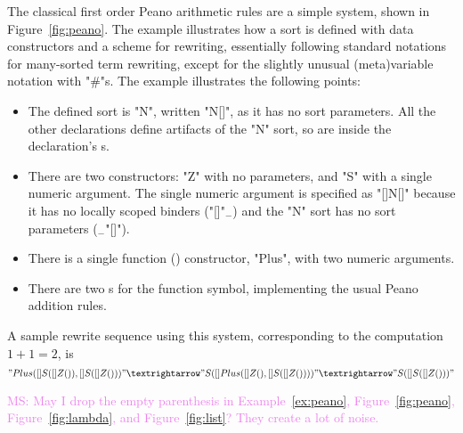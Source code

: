 \documentclass[letterpaper,11pt]{article}
\newcommand{\MS}[1]{\textcolor{violet}{MS: #1}}
\begin{document}
\begin{figure*}[p]
\end{figure*}



\begin{example}[Peano]\label{ex:peano}
  The classical first order Peano arithmetic rules are a simple \hax system, shown in
  Figure~\ref{fig:peano}.  The example illustrates how a sort is defined with data constructors and
  a scheme for rewriting, essentially following standard notations for many-sorted term rewriting,
  except for the slightly unusual (meta)variable notation with "#"s. The example illustrates the
  following points:
  \begin{itemize}

  \item The defined sort is "N", written "N[]", as it has no sort parameters. All the other
    declarations define artifacts of the "N" sort, so are inside the  declaration's
    \kw{\{\}}s.

  \item There are two  constructors: "Z" with no parameters, and "S" with a single numeric
    argument. The single numeric argument is specified as "[]N[]" because it has no locally scoped
    binders ("[]"$_-$) and the "N" sort has no sort parameters ($_-$"[]").

  \item There is a single function () constructor, "Plus", with two numeric arguments.

  \item There are two s for the function symbol, implementing the usual Peano addition rules.

  \end{itemize}
  A sample rewrite sequence using this system, corresponding to the computation $1+1=2$, is
  \begin{displaymath}
    "Plus([]S([]Z()), []S([]Z()))" →
    "S([]Plus([]Z(), []S([]Z())))" →
    "S([]S([]Z()))"
  \end{displaymath}
\end{example}
\MS{May I drop the empty parenthesis in Example~\ref{ex:peano}, Figure~\ref{fig:peano},
  Figure~\ref{fig:lambda}, and Figure~\ref{fig:list}? They create a lot of noise.}
\end{document}
